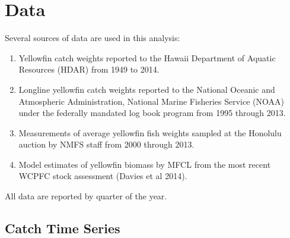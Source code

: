 \documentclass[12pt,letterpaper]{article}
\begin{document}
\section*{Data}
Several sources of data are used in this analysis:
\begin{enumerate}
\item  Yellowfin catch weights reported to the Hawaii Department of Aquatic
Resources (HDAR) from 1949 to 2014.
\item Longline yellowfin catch weights reported to the National Oceanic and
Atmospheric Administration, National Marine Fisheries Service (NOAA)
under the federally mandated log book program from 1995 through 2013.
\item Measurements of average yellowfin fish weights sampled at the
Honolulu auction by NMFS staff from 2000 through 2013.
\item Model estimates of yellowfin biomass by MFCL
from the most recent WCPFC stock assessment (Davies et al 2014).
\end{enumerate}
All data are reported by quarter of the year.

\subsection*{Catch Time Series}


\end{document}
